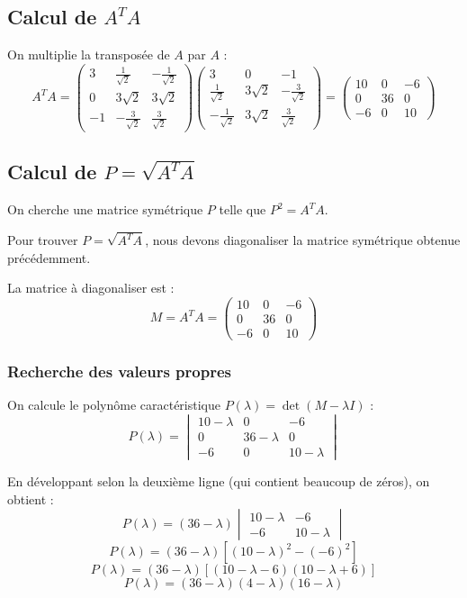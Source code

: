 \documentclass[french]{yLectureNote}
\begin{document}
\subsection{Calcul de $A^T A$}
On multiplie la transposée de $A$ par $A$ :
$$A^T A = \begin{pmatrix} 3 & \frac{1}{\sqrt{2}} & -\frac{1}{\sqrt{2}} \\ 0 & 3\sqrt{2} & 3\sqrt{2} \\ -1 & -\frac{3}{\sqrt{2}} & \frac{3}{\sqrt{2}} \end{pmatrix} \begin{pmatrix} 3 & 0 & -1 \\ \frac{1}{\sqrt{2}} & 3\sqrt{2} & -\frac{3}{\sqrt{2}} \\ -\frac{1}{\sqrt{2}} & 3\sqrt{2} & \frac{3}{\sqrt{2}} \end{pmatrix} = \begin{pmatrix} 10 & 0 & -6 \\ 0 & 36 & 0 \\ -6 & 0 & 10 \end{pmatrix}$$

\subsection{Calcul de $P = \sqrt{A^T A}$}
On cherche une matrice symétrique $P$ telle que $P^2 = A^T A$. 

Pour trouver $P = \sqrt{A^T A}$, nous devons diagonaliser la matrice symétrique obtenue précédemment.

La matrice à diagonaliser est :
$$M = A^T A = \begin{pmatrix} 10 & 0 & -6 \\ 0 & 36 & 0 \\ -6 & 0 & 10 \end{pmatrix}$$

\subsubsection{Recherche des valeurs propres}
On calcule le polynôme caractéristique $P(\lambda) = \det(M - \lambda I)$ :
$$P(\lambda) = \begin{vmatrix} 10-\lambda & 0 & -6 \\ 0 & 36-\lambda & 0 \\ -6 & 0 & 10-\lambda \end{vmatrix}$$

En développant selon la deuxième ligne (qui contient beaucoup de zéros), on obtient :
$$P(\lambda) = (36-\lambda) \begin{vmatrix} 10-\lambda & -6 \\ -6 & 10-\lambda \end{vmatrix}$$
$$P(\lambda) = (36-\lambda) \left[ (10-\lambda)^2 - (-6)^2 \right]$$
$$P(\lambda) = (36-\lambda) \left[ (10-\lambda - 6)(10-\lambda + 6) \right]$$
$$P(\lambda) = (36-\lambda) (4-\lambda) (16-\lambda)$$
\end{document}
